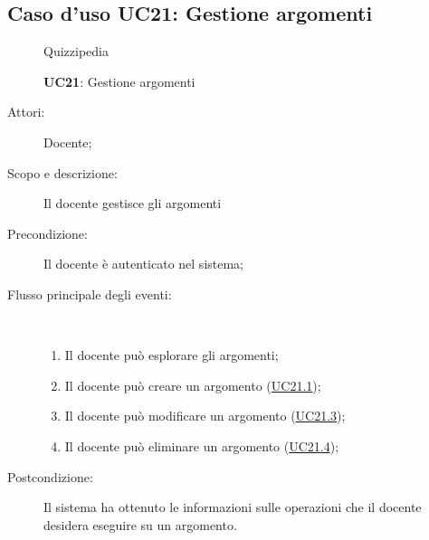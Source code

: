 \subsection{Caso d'uso UC21: Gestione argomenti}
\begin{figure}[H]
	\centering
	\begin{resizedtikzpicture}{\textwidth}
		\begin{umlsystem}[x=0, fill=lightgray!20]{Quizzipedia}
		\end{umlsystem}
	\end{resizedtikzpicture}
	\caption{\textbf{UC21}: Gestione argomenti}
	\label{UC21}
\end{figure}
\begin{description}
	\item[Attori:] Docente;
	\item[Scopo e descrizione:] Il docente gestisce gli argomenti
	\item[Precondizione:] Il docente è autenticato nel sistema;
	
	\item[Flusso principale degli eventi:] \ 
	\begin{enumerate}
		\item Il docente può esplorare gli argomenti;
		\item Il docente può creare un argomento (\hyperlink{UC21.1}{UC21.1});
		\item Il docente può modificare un argomento (\hyperlink{UC21.3}{UC21.3});
		\item Il docente può eliminare un argomento (\hyperlink{UC21.4}{UC21.4});
		
	\end{enumerate}
	\item[Postcondizione:] Il sistema ha ottenuto le informazioni sulle operazioni che il docente desidera eseguire su un argomento.
\end{description}
\hypertarget{UC21.1}{}

